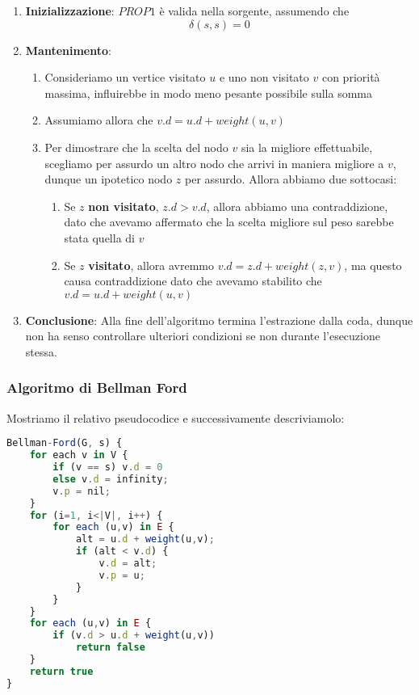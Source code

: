 \documentclass{article}
\begin{document}
\begin{enumerate}
    \item \textbf{Inizializzazione}: $PROP1$ è valida nella sorgente, 
    assumendo che
\[\delta(s,s) = 0\]

\vskip 1cm

    \item \textbf{Mantenimento}:
    \begin{enumerate}
        \item Consideriamo un vertice visitato $u$ e uno non visitato $v$ con priorità massima, influirebbe in modo meno pesante possibile sulla somma
        \item Assumiamo allora che $v.d = u.d + weight(u,v)$
        \item Per dimostrare che la scelta del nodo $v$ sia la migliore effettuabile, scegliamo per assurdo un altro nodo che arrivi in maniera migliore a $v$, dunque un ipotetico nodo $z$ per assurdo. Allora abbiamo due sottocasi:
        \begin{enumerate}
            \item Se $z$ \textbf{non visitato}, $z.d > v.d$, allora abbiamo una contraddizione, dato che avevamo affermato che la scelta migliore sul peso sarebbe stata quella di $v$
            \item Se $z$ \textbf{visitato}, allora avremmo $v.d = z.d + weight(z,v)$, ma questo causa contraddizione dato che avevamo stabilito che $v.d = u.d + weight(u,v)$
        \end{enumerate}
    \end{enumerate} 

    \vskip 2cm

    
    \item \textbf{Conclusione}: Alla fine dell'algoritmo termina l'estrazione dalla coda, dunque non ha senso controllare ulteriori condizioni se non durante l'esecuzione stessa.
\end{enumerate}

\newpage

\subsubsection{Algoritmo di Bellman Ford}

Mostriamo il relativo pseudocodice e successivamente descriviamolo:
\begin{lstlisting}[language=JavaScript]
Bellman-Ford(G, s) {
    for each v in V {
        if (v == s) v.d = 0
        else v.d = infinity;
        v.p = nil;
    }
    for (i=1, i<|V|, i++) {
        for each (u,v) in E {
            alt = u.d + weight(u,v);
            if (alt < v.d) {
                v.d = alt;
                v.p = u;
            }
        }
    }
    for each (u,v) in E {
        if (v.d > u.d + weight(u,v)) 
            return false
    }
    return true
}
\end{lstlisting}
\end{document}
